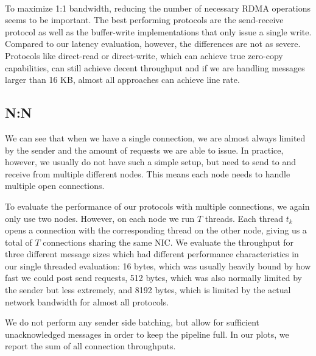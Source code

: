\pagebreak
\paragraph{} To maximize 1:1 bandwidth, reducing the number of necessary RDMA operations seems to be important.
The best performing protocols are the \mbox{send-receive} protocol as well as the buffer-write implementations that only issue 
a single write. Compared to our latency evaluation, however, the differences are not as severe. 
Protocols like direct-read or direct-write, which can achieve true zero-copy capabilities, can still achieve decent 
throughput and if we are handling messages larger than 16 KB, almost all approaches can achieve line rate.




\pagebreak
\subsection{N:N}


We can see that when we have a single connection, we are almost always limited by the sender and the 
amount of requests we are able to issue. In practice, however, we usually do not have such a simple setup, but 
need to send to and receive from multiple different nodes. This means each node needs to handle multiple open
connections. 

To evaluate the performance of our protocols with multiple connections, we again only use two nodes. However,  
on each node we run $T$ threads. Each thread $t_k$ opens a connection with the corresponding 
thread on the other node, giving us a total of $T$ connections sharing the same NIC. We evaluate the throughput for 
three different message sizes which had different performance characteristics in our single threaded evaluation: 16 bytes, 
which was usually heavily bound by how fast we could post send requests, 512 bytes, which was also normally limited by the 
sender but less extremely, and 8192 bytes, which is limited by the actual network bandwidth for almost all protocols. 

We do not perform any sender side batching, but allow for sufficient unacknowledged messages in order to keep the pipeline full.
In our plots, we report the sum of all connection throughputs.


